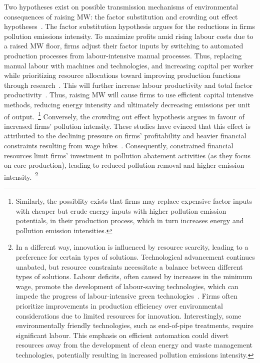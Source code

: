 \documentclass[12pt, english]{article}
\begin{document}
    Two hypotheses exist on possible transmission mechanisms of environmental consequences of raising MW: the factor substitution and crowding out effect hypotheses~\parencite{zhang2023unintended}. The factor substitution hypothesis argues for the reductions in firms pollution emissions intensity. To maximize profits amid rising labour costs due to a raised MW floor, firms adjust their factor inputs by switching to automated production processes from labour-intensive manual processes. Thus, replacing manual labour with machines and technologies, and increasing capital per worker while prioritizing resource allocations toward improving production functions through research~\parencite{harasztosi2019pays,hau2020firm, geng2022minimum,dai2023minimum, li2020labor}. This will further increase labour productivity and total factor productivity~\parencite{riley2017raising}. Thus, raising MW will cause firms to use efficient capital intensive methods, reducing energy intensity and ultimately decreasing emissions per unit of output.~\footnote{\tiny Similarly, the possiblity exists that firms may replace expensive factor inputs with cheaper but crude energy inputs with higher pollution emission potentials, in their production process, which in turn increases energy and pollution emission intensities.} Conversely, the crowding out effect hypothesis argues in favour of increased firms' pollution intensity. These studies have evinced that this effect is attributed to the declining pressure on firms' profitability and heavier financial constraints resulting from wage hikes~\parencite{draca2011minimum, bell2018minimum, du2022minimum}. Consequently, constrained financial resources limit firms' investment in pollution abatement activities (as they focus on core production), leading to reduced pollution removal and higher emission intensity.~\footnote{\tiny In a different way, innovation is influenced by resource scarcity, leading to a preference for certain types of solutions. Technological advancement continues unabated, but resource constraints necessitate a balance between different types of solutions. Labour deficits, often caused by increases in the minimum wage, promote the development of labour-saving technologies, which can impede the progress of labour-intensive green technologies~\parencite{acemoglu2010does}. Firms often prioritize improvements in production efficiency over environmental considerations due to limited resources for innovation. Interestingly, some environmentally friendly technologies, such as end-of-pipe treatments, require significant labour. This emphasis on efficient automation could divert resources away from the development of clean energy and waste management technologies, potentially resulting in increased pollution emissions intensity.}
\end{document}
